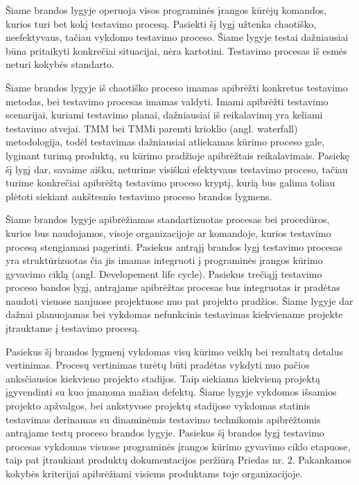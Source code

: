 \documentclass{VUMIFPSkursinis}
\begin{document}
Šiame brandos lygyje operuoja visos programinės įrangos kūrėjų komandos, kurios turi bet kokį testavimo procesą. Pasiekti šį lygį užtenka chaotiško, neefektyvaus, tačiau vykdomo testavimo proceso. Šiame lygyje testai dažniausiai būna pritaikyti konkrečiai situacijai, nėra kartotini. Testavimo procesas iš esmės neturi kokybės standarto.

Šiame brandos lygyje iš chaotiško proceso imamas apibrėžti konkretus testavimo metodas, bei testavimo procesas imamas valdyti. Imami apibrėžti testavimo scenarijai, kuriami testavimo planai, dažniausiai iš reikalavimų yra keliami testavimo atvejai. TMM bei TMMi paremti krioklio (angl. waterfall) metodologija, todėl testavimas dažniausiai atliekamas kūrimo proceso gale, lyginant turimą produktą, su kūrimo pradžioje apibrėžtais reikalavimais. Pasiekę šį lygį dar, savaime aišku, neturime visiškai efektyvaus testavimo proceso, tačiau turime konkrečiai apibrėžtą testavimo proceso kryptį, kurią bus galima toliau plėtoti siekiant aukštesnio testavimo proceso brandos lygmens.

Šiame brandos lygyje apibrėžiamas standartizuotas procesas bei procedūros, kurios bus naudojamos, visoje organizacijoje ar komandoje, kurios testavimo procesą stengiamasi pagerinti. Pasiekus antrąjį brandos lygį testavimo procesas yra struktūrizuotas čia jis imamas integruoti į programinės įrangos kūrimo gyvavimo ciklą (angl. Developement life cycle). Pasiekus trečiąjį testavimo proceso bandos lygį, antrąjame apibrėžtas procesas bus integruotas ir pradėtas naudoti visuose naujuose projektuose nuo pat projekto pradžios. Šiame lygyje dar dažnai planuojamas bei vykdomas nefunkcinis testavimas kiekviename projekte įtrauktame į testavimo procesą.

Pasiekus šį brandos lygmenį vykdomas visų kūrimo veiklų bei rezultatų detalus vertinimas. Procesų vertinimas turėtų būti pradėtas vykdyti nuo pačios anksčiausios kiekvieno projekto stadijos. Taip siekiama kiekvieną projektą įgyvendinti su kuo įmanoma mažiau defektų. Šiame lygyje vykdomos išsamios projekto apžvalgos, bei ankstyvose projektų stadijose vykdomas statinis testavimas derinamas su dinaminėmis testavimo technikomis apibrėžtomis antrąjame testų proceso brandos lygyje. Pasiekus šį brandos lygį testavimo procesas vykdomas visuose programinės įrangos kūrimo gyvavimo ciklo etapuose, taip pat įtraukiant produktų dokumentacijos peržiūrą Priedas nr. 2. Pakankamos kokybės kriterijai apibrėžiami visiems produktams toje organizacijoje.
\end{document}
